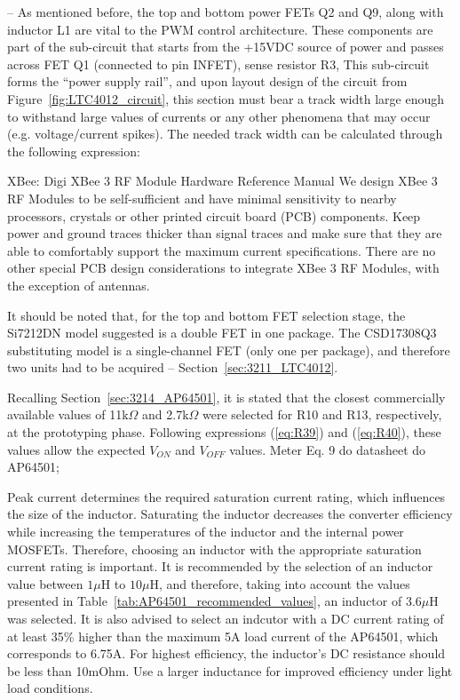 -- As mentioned before, the top and bottom power FETs Q2 and Q9, along with inductor L1 are vital to the PWM control architecture. These components are part of the sub-circuit that starts from the +15VDC source of power and passes across FET Q1 (connected to pin INFET), sense resistor R3, 
This sub-circuit forms the ``power supply rail'', and upon layout design of the circuit from Figure~\ref{fig:LTC4012_circuit}, this section must bear a track width large enough to withstand large values of currents or any other phenomena that may occur (e.g. voltage/current spikes). The needed track width can be calculated through the following expression:

XBee: Digi XBee 3 RF Module Hardware Reference Manual
We design XBee 3 RF Modules to be self-sufficient and have minimal sensitivity to nearby processors,
crystals or other printed circuit board (PCB) components. Keep power and ground traces thicker than
signal traces and make sure that they are able to comfortably support the maximum current
specifications. There are no other special PCB design considerations to integrate XBee 3 RF Modules,
with the exception of antennas.




It should be noted that, for the top and bottom FET selection stage, the Si7212DN model suggested is a double FET in one package. The CSD17308Q3 substituting model is a single-channel FET (only one per package), and therefore two units had to be acquired -- Section~\ref{sec:3211_LTC4012}.

Recalling Section~\ref{sec:3214_AP64501}, it is stated that the closest commercially available values of 11k$\Omega$ and 2.7k$\Omega$ were selected for R10 and R13, respectively, at the prototyping phase. Following expressions (\ref{eq:R39}) and (\ref{eq:R40}), these values allow the expected $V_{ON}$ and $V_{OFF}$ values.
    Meter Eq. 9 do datasheet do AP64501;
    
    Peak current determines the required saturation current rating, which influences the size of the inductor. Saturating the inductor decreases the converter efficiency while increasing the temperatures of the inductor and the internal power MOSFETs. Therefore, choosing an inductor with the appropriate saturation current rating is important. 
    It is recommended by \cite{AP64501} the selection of an inductor value between $1 \mu$H to $10 \mu$H, and therefore, taking into account the values presented in Table~\ref{tab:AP64501_recommended_values}, an inductor of $3.6 \mu$H was selected. It is also advised to select an indcutor with a DC current rating of at least 35\% higher than the maximum 5A load current of the AP64501, which corresponds to 6.75A.
    For highest efficiency, the inductor's DC resistance should be less than 10mOhm. Use a larger inductance for improved efficiency under light load conditions.


